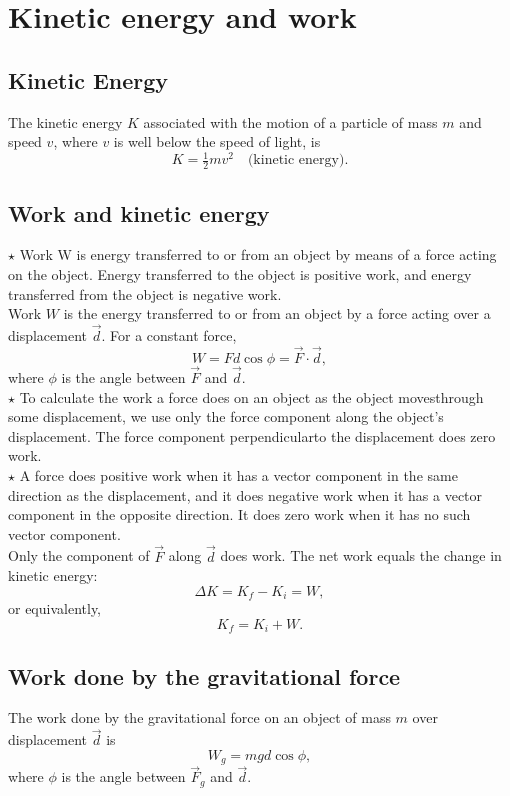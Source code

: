 \section{Kinetic energy and work}
\subsection{Kinetic Energy}
The kinetic energy $K$ associated with the motion of a particle of mass $m$ and speed $v$, where $v$ is well below the speed of light, is
\[
K = \tfrac{1}{2}mv^2 \quad \text{(kinetic energy).}
\]

\subsection{Work and kinetic energy}

$\star$ Work W is energy transferred to or from an object by means of a force acting on
the object. Energy transferred to the object is positive work, and energy transferred from the object is negative work.\\
Work $W$ is the energy transferred to or from an object by a force acting over a displacement $\vec{d}$. For a constant force,
\[
W = Fd\cos\phi = \vec{F} \cdot \vec{d},
\]
where $\phi$ is the angle between $\vec{F}$ and $\vec{d}$.
\\
$\star$ To calculate the work a force does on an object as the object movesthrough some
displacement, we use only the force component along the object’s displacement.
The force component perpendicularto the displacement does zero work.\\
$\star$ A force does positive work when it has a vector component in the same direction
as the displacement, and it does negative work when it has a vector component in
the opposite direction. It does zero work when it has no such vector component.\\

Only the component of $\vec{F}$ along $\vec{d}$ does work. The net work equals the change in kinetic energy:
\[
\Delta K = K_f - K_i = W,
\]
or equivalently,
\[
K_f = K_i + W.
\]

\subsection{Work done by the gravitational force}

The work done by the gravitational force on an object of mass $m$ over displacement $\vec{d}$ is
\[
W_g = mgd \cos \phi,
\]
where $\phi$ is the angle between $\vec{F}_g$ and $\vec{d}$.

